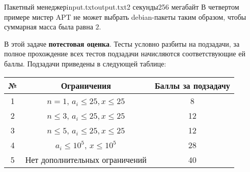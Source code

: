 \begin{problem}{Пакетный менеджер}{input.txt}{output.txt}{2 секунды}{256 мегабайт}
В четвертом примере мистер APT не может выбрать debian-пакеты таким образом, чтобы суммарная масса была равна $2$.

\Scoring

В этой задаче \textbf{потестовая оценка}. Тесты условно разбиты на подзадачи, за полное прохождение всех тестов подзадачи начисляются соответствующие ей баллы. Подзадачи приведены в следующей таблице:

\medskip

\begin{tabular}{| c | c | c |} \hline
	№ & Ограничения & Баллы за подзадачу \\ \hline
	1 & $n = 1$, $a_i \le 25, x \le 25$ & 8 \\ \hline
	2 & $n \le 3$, $a_i \le 25, x \le 25$ & 12 \\ \hline
	3 & $n \le 5$, $a_i \le 25, x \le 25$ & 12 \\ \hline
	4 & $a_i \le 10^5$, $x \le 10^5$ & 28 \\ \hline
	5 & Нет дополнительных ограничений & 40 \\ \hline
\end{tabular}

\end{problem}

